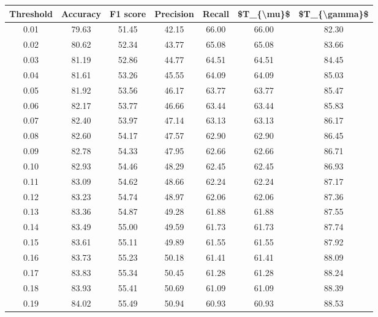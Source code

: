\begin{tabular}{|c|c|c|c|c|c|c|}
\hline
 Threshold &  Accuracy &  F1 score &  Precision &  Recall &  \$T\_\{\textbackslash mu\}\$ &  \$T\_\{\textbackslash gamma\}\$ \\
\hline
      0.01 &     79.63 &     51.45 &      42.15 &   66.00 &      66.00 &         82.30 \\
      0.02 &     80.62 &     52.34 &      43.77 &   65.08 &      65.08 &         83.66 \\
      0.03 &     81.19 &     52.86 &      44.77 &   64.51 &      64.51 &         84.45 \\
      0.04 &     81.61 &     53.26 &      45.55 &   64.09 &      64.09 &         85.03 \\
      0.05 &     81.92 &     53.56 &      46.17 &   63.77 &      63.77 &         85.47 \\
      0.06 &     82.17 &     53.77 &      46.66 &   63.44 &      63.44 &         85.83 \\
      0.07 &     82.40 &     53.97 &      47.14 &   63.13 &      63.13 &         86.17 \\
      0.08 &     82.60 &     54.17 &      47.57 &   62.90 &      62.90 &         86.45 \\
      0.09 &     82.78 &     54.33 &      47.95 &   62.66 &      62.66 &         86.71 \\
      0.10 &     82.93 &     54.46 &      48.29 &   62.45 &      62.45 &         86.93 \\
      0.11 &     83.09 &     54.62 &      48.66 &   62.24 &      62.24 &         87.17 \\
      0.12 &     83.23 &     54.74 &      48.97 &   62.06 &      62.06 &         87.36 \\
      0.13 &     83.36 &     54.87 &      49.28 &   61.88 &      61.88 &         87.55 \\
      0.14 &     83.49 &     55.00 &      49.59 &   61.73 &      61.73 &         87.74 \\
      0.15 &     83.61 &     55.11 &      49.89 &   61.55 &      61.55 &         87.92 \\
      0.16 &     83.73 &     55.23 &      50.18 &   61.41 &      61.41 &         88.09 \\
      0.17 &     83.83 &     55.34 &      50.45 &   61.28 &      61.28 &         88.24 \\
      0.18 &     83.93 &     55.41 &      50.69 &   61.09 &      61.09 &         88.39 \\
      0.19 &     84.02 &     55.49 &      50.94 &   60.93 &      60.93 &         88.53 \\

\end{tabular}
